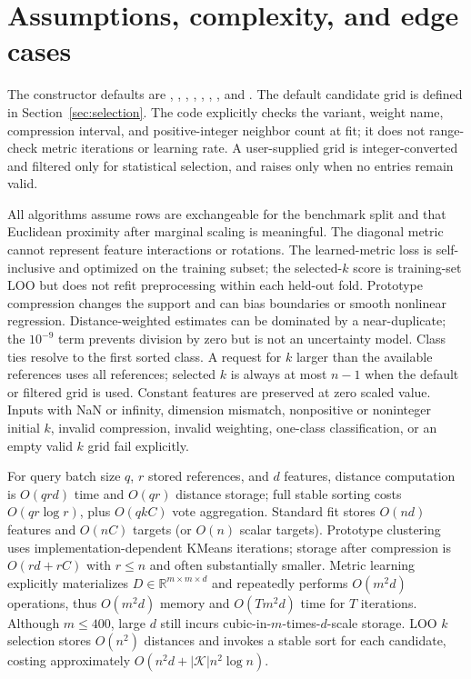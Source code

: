 \documentclass[conference]{IEEEtran}
\begin{document}
\section{Assumptions, complexity, and edge cases}
The constructor defaults are , , , , , , , and . The default candidate grid is defined in Section~\ref{sec:selection}. The code explicitly checks the variant, weight name, compression interval, and positive-integer neighbor count at fit; it does not range-check metric iterations or learning rate. A user-supplied grid is integer-converted and filtered only for statistical selection, and raises only when no entries remain valid.

All algorithms assume rows are exchangeable for the benchmark split and that Euclidean proximity after marginal scaling is meaningful. The diagonal metric cannot represent feature interactions or rotations. The learned-metric loss is self-inclusive and optimized on the training subset; the selected-$k$ score is training-set LOO but does not refit preprocessing within each held-out fold. Prototype compression changes the support and can bias boundaries or smooth nonlinear regression. Distance-weighted estimates can be dominated by a near-duplicate; the $10^{-9}$ term prevents division by zero but is not an uncertainty model. Class ties resolve to the first sorted class. A request for $k$ larger than the available references uses all references; selected $k$ is always at most $n-1$ when the default or filtered grid is used. Constant features are preserved at zero scaled value. Inputs with NaN or infinity, dimension mismatch, nonpositive or noninteger initial $k$, invalid compression, invalid weighting, one-class classification, or an empty valid $k$ grid fail explicitly.

For query batch size $q$, $r$ stored references, and $d$ features, distance computation is $O(qrd)$ time and $O(qr)$ distance storage; full stable sorting costs $O(qr\log r)$, plus $O(qkC)$ vote aggregation. Standard fit stores $O(nd)$ features and $O(nC)$ targets (or $O(n)$ scalar targets). Prototype clustering uses implementation-dependent KMeans iterations; storage after compression is $O(r d+rC)$ with $r\leq n$ and often substantially smaller. Metric learning explicitly materializes $D\in\mathbb R^{m\times m\times d}$ and repeatedly performs $O(m^2d)$ operations, thus $O(m^2d)$ memory and $O(Tm^2d)$ time for $T$ iterations. Although $m\leq400$, large $d$ still incurs cubic-in-$m$-times-$d$-scale storage. LOO $k$ selection stores $O(n^2)$ distances and invokes a stable sort for each candidate, costing approximately $O(n^2d+|\mathcal K|n^2\log n)$.
\end{document}
